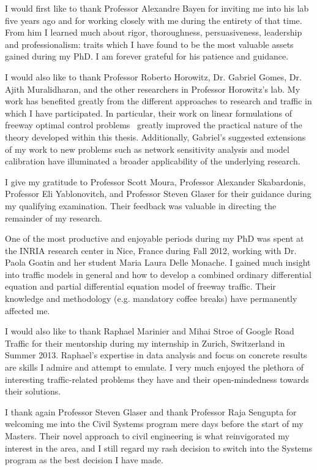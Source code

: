 I would first like to thank Professor Alexandre Bayen for inviting me into his lab five years ago and for working closely with me during the entirety of that time. From him I learned much about rigor, thoroughness, persuasiveness, leadership and professionalism: traits which I have found to be the most valuable assets gained during my PhD. I am forever grateful for his patience and guidance.

I would also like to thank Professor Roberto Horowitz, Dr. Gabriel Gomes, Dr. Ajith Muralidharan, and the other researchers in Professor Horowitz's lab. My work has benefited greatly from the different approaches to research and traffic in which I have participated. In particular, their work on linear formulations of freeway optimal control problems~\cite{gomes2006optimal,Muralidharana} greatly improved the practical nature of the theory developed within this thesis. Additionally, Gabriel's suggested extensions of my work to new problems such as network sensitivity analysis and model calibration have illuminated a broader applicability of the underlying research.

I give my gratitude to Professor Scott Moura, Professor Alexander Skabardonis, Professor Eli Yablonovitch, and Professor Steven Glaser for their guidance during my qualifying examination. Their feedback was valuable in directing the remainder of my research.


One of the most productive and enjoyable periods during my PhD was spent at the INRIA research center in Nice, France during Fall 2012, working with Dr. Paola Goatin and her student Maria Laura Delle Monache. I gained much insight into traffic models in general and how to develop a combined ordinary differential equation and partial differential equation model of freeway traffic. Their knowledge and methodology (e.g. mandatory coffee breaks) have permanently affected me.

I would also like to thank Raphael Marinier and Mihai Stroe of Google Road Traffic for their mentorship during my internship in Zurich, Switzerland in Summer 2013. Raphael's expertise in data analysis and focus on concrete results are skills I admire and attempt to emulate. I very much enjoyed the plethora of interesting traffic-related problems they have and their open-mindedness towards their solutions.

I thank again Professor Steven Glaser and thank Professor Raja Sengupta for welcoming me into the Civil Systems program mere days before the start of my Masters. Their novel approach to civil engineering is what reinvigorated my interest in the area, and I still regard my rash decision to switch into the Systems program as the best decision I have made.

